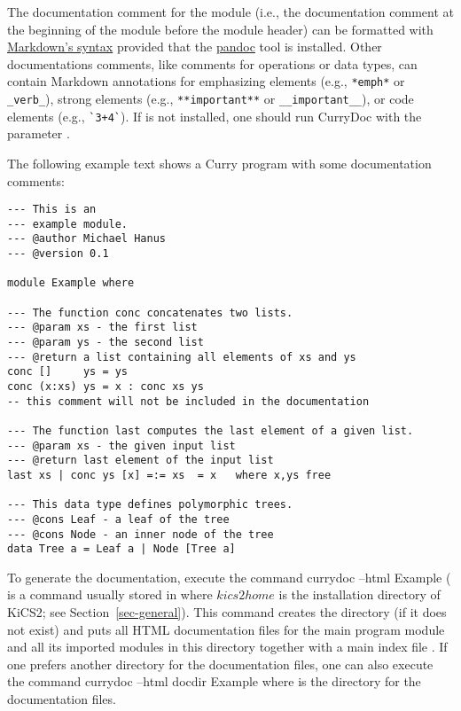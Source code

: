 The documentation comment for the module (i.e., the documentation
comment at the beginning of the module before the module header)
can be formatted with
\href{http://en.wikipedia.org/wiki/Markdown}{Markdown's syntax}
provided that the
\href{http://johnmacfarlane.net/pandoc/}{pandoc}
 tool is installed.
Other documentations comments, like comments for operations
or data types, can contain Markdown annotations for
emphasizing elements (e.g., \verb!*emph*! or \verb!_verb_!),
strong elements (e.g., \verb!**important**! or \verb!__important__!),
or code elements (e.g., \verb!`3+4`!).
If  is not installed, one should run CurryDoc
with the parameter .

The following example text shows a Curry program with some
documentation comments:
{\renewcommand{\baselinestretch}{1.0}
\begin{verbatim}
--- This is an
--- example module.
--- @author Michael Hanus
--- @version 0.1

module Example where

--- The function conc concatenates two lists.
--- @param xs - the first list
--- @param ys - the second list
--- @return a list containing all elements of xs and ys
conc []     ys = ys
conc (x:xs) ys = x : conc xs ys
-- this comment will not be included in the documentation

--- The function last computes the last element of a given list.
--- @param xs - the given input list
--- @return last element of the input list
last xs | conc ys [x] =:= xs  = x   where x,ys free

--- This data type defines polymorphic trees.
--- @cons Leaf - a leaf of the tree
--- @cons Node - an inner node of the tree
data Tree a = Leaf a | Node [Tree a]
\end{verbatim}
}
\noindent
To generate the documentation, execute the command
\startprog
currydoc --html Example
\stopprog
( is a command usually stored in 
where $kics2home$ is the installation directory of KiCS2;
see Section~\ref{sec-general}).
This command creates the directory  (if it does not exist)
and puts all HTML documentation files for the main program module
and all its imported modules in this directory together with
a main index file .
If one prefers another directory for the documentation files,
one can also execute the command
\startprog
currydoc --html docdir Example
\stopprog
where  is the directory for the documentation files.

